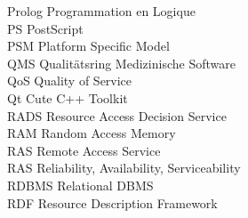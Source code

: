 \begin{tabbing}

    \>Prolog \>\>Programmation en Logique\\

    \>PS \>\>PostScript\\

    \>PSM \>\>Platform Specific Model\\






    \>QMS \>\>Qualit\"{a}tsring Medizinische Software\\

    \>QoS \>\>Quality of Service\\

    \>Qt \>\>Cute C++ Toolkit\\




    \>RADS \>\>Resource Access Decision Service\\

    \>RAM \>\>Random Access Memory\\


    \>RAS \>\>Remote Access Service\\

    \>RAS \>\>Reliability, Availability, Serviceability\\

    \>RDBMS \>\>Relational DBMS\\

    \>RDF \>\>Resource Description Framework\\


\end{tabbing}
